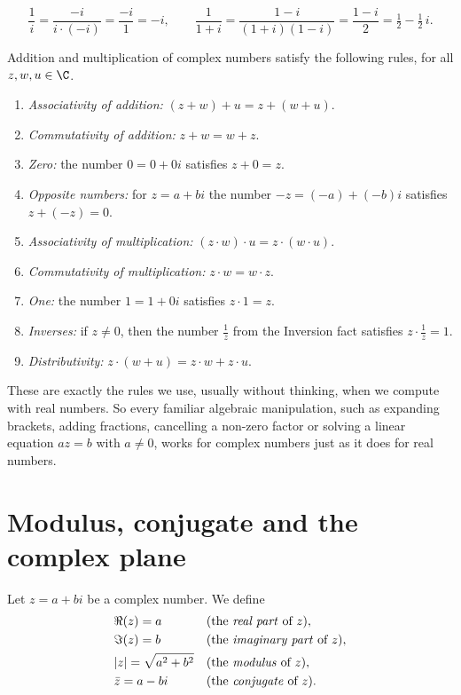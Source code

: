 \begin{example}
\[
\frac{1}{i} = \frac{-i}{i\cdot(-i)} = \frac{-i}{1} = -i, \qquad
\frac{1}{1+i} = \frac{1-i}{(1+i)(1-i)} = \frac{1-i}{2} =\tfrac12 - \tfrac12\, i.
\]
\end{example}

\begin{theorem}
Addition and multiplication of complex numbers satisfy the following rules, for all $z,w,u\in\C$.
\begin{enumerate}[label=(\arabic*)]
\item \emph{Associativity of addition:} \quad $(z+w)+u = z+(w+u)$.
\item \emph{Commutativity of addition:} \quad $z+w = w+z$.
\item \emph{Zero:} the number $0=0+0i$ satisfies \quad $z+0 = z$.
\item \emph{Opposite numbers:} for $z=a+bi$ the number $-z=(-a)+(-b)i$ satisfies \quad $z+(-z) = 0$.
\item \emph{Associativity of multiplication:} \quad $(z\cdot w)\cdot u = z\cdot (w\cdot u)$.
\item \emph{Commutativity of multiplication:} \quad $z\cdot w = w\cdot z$.
\item \emph{One:} the number $1=1+0i$ satisfies \quad $z\cdot 1 = z$.
\item \emph{Inverses:} if $z\neq 0$, then the number $\frac1z$ from the Inversion fact satisfies
\quad $z\cdot\frac1z = 1$.
\item \emph{Distributivity:} \quad $z\cdot(w+u) = z\cdot w + z\cdot u$.
\end{enumerate}
\end{theorem}

\noindent These are exactly the rules we use, usually without thinking, when we compute with real numbers.
So every familiar algebraic manipulation, such as expanding brackets, adding fractions, cancelling a non-zero
factor or solving a linear equation $az=b$ with $a\neq 0$, works for complex numbers just as it does for
real numbers.

\section{Modulus, conjugate and the complex plane}

\begin{definition}
Let $z=a+bi$ be a complex number. We define
\[
\begin{aligned}
&\Re(z)=a && \text{(the \emph{real part} of $z$)},\\
&\Im(z)=b && \text{(the \emph{imaginary part} of $z$)},\\
&|z|=\sqrt{a^2+b^2} && \text{(the \emph{modulus} of $z$)},\\
&\bar{z}=a-bi && \text{(the \emph{conjugate} of $z$)}.
\end{aligned}
\]
\end{definition}

